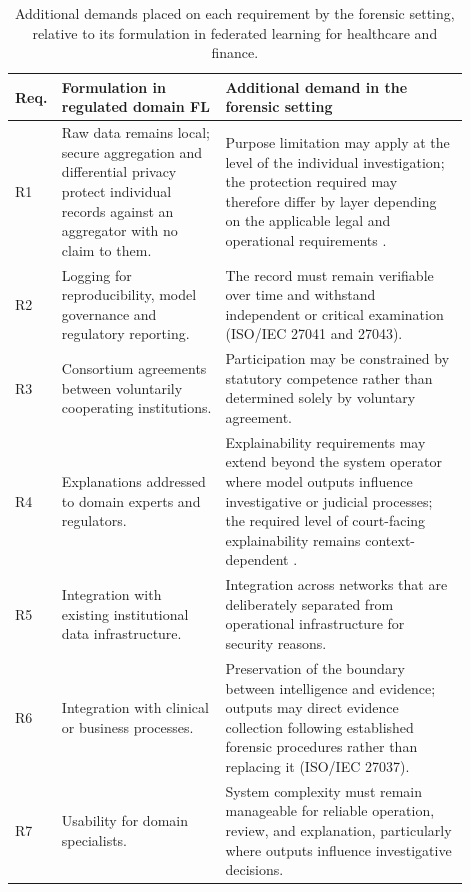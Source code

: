 \begin{table}[th]
\caption{Additional demands placed on each requirement by the forensic setting, relative to its formulation in federated learning for healthcare and finance.}
\label{tab:domain_contrast}
\centering
\scriptsize 
\begin{tabular}{@{}p{0.03\linewidth}p{0.35\linewidth}p{0.52\linewidth}@{}}
\toprule
\textbf{Req.} & \textbf{Formulation in regulated domain FL} & \textbf{Additional demand in the forensic setting} \\
\midrule

R1 & Raw data remains local; secure aggregation and differential privacy protect individual records against an aggregator with no claim to them. & Purpose limitation may apply at the level of the individual investigation; the protection required may therefore differ by layer depending on the applicable legal and operational requirements \citep{gdpr_article5,directive2016680}. \\
\addlinespace
R2 & Logging for reproducibility, model governance and regulatory reporting. & The record must remain verifiable over time and withstand independent or critical examination (ISO/IEC 27041 and 27043). \\
\addlinespace
R3 & Consortium agreements between voluntarily cooperating institutions. & Participation may be constrained by statutory competence rather than determined solely by voluntary agreement. \\
\addlinespace
R4 & Explanations addressed to domain experts and regulators. & Explainability requirements may extend beyond the system operator where model outputs influence investigative or judicial processes; the required level of court-facing explainability remains context-dependent \citep{echr_art6,cfreu_art47}. \\
\addlinespace
R5 & Integration with existing institutional data infrastructure. & Integration across networks that are deliberately separated from operational infrastructure for security reasons. \\
\addlinespace
R6 & Integration with clinical or business processes. & Preservation of the boundary between intelligence and evidence; outputs may direct evidence collection following established forensic procedures rather than replacing it (ISO/IEC 27037). \\
\addlinespace
R7 & Usability for domain specialists. & System complexity must remain manageable for reliable operation, review, and explanation, particularly where outputs influence investigative decisions. \\




\bottomrule
\end{tabular}
\end{table}




